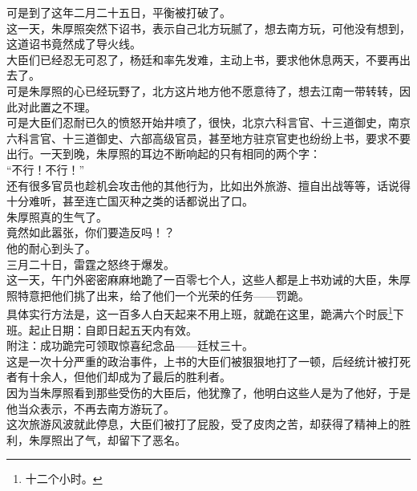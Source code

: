 \begin{multicols}{\theparacolNo}
可是到了这年二月二十五日，平衡被打破了。\\

这一天，朱厚照突然下诏书，表示自己北方玩腻了，想去南方玩，可他没有想到，这道诏书竟然成了导火线。\\

大臣们已经忍无可忍了，杨廷和率先发难，主动上书，要求他休息两天，不要再出去了。\\

可是朱厚照的心已经玩野了，北方这片地方他不愿意待了，想去江南一带转转，因此对此置之不理。\\

可是大臣们忍耐已久的愤怒开始井喷了，很快，北京六科言官、十三道御史，南京六科言官、十三道御史、六部高级官员，甚至地方驻京官吏也纷纷上书，要求不要出行。一天到晚，朱厚照的耳边不断响起的只有相同的两个字：\\

“不行！不行！”\\

还有很多官员也趁机会攻击他的其他行为，比如出外旅游、擅自出战等等，话说得十分难听，甚至连亡国灭种之类的话都说出了口。\\

朱厚照真的生气了。\\

竟然如此嚣张，你们要造反吗！？\\

他的耐心到头了。\\

三月二十日，雷霆之怒终于爆发。\\

这一天，午门外密密麻麻地跪了一百零七个人，这些人都是上书劝诫的大臣，朱厚照特意把他们挑了出来，给了他们一个光荣的任务——罚跪。\\

具体实行方法是，这一百多人白天起来不用上班，就跪在这里，跪满六个时辰\footnote{十二个小时。}下班。起止日期：自即日起五天内有效。\\

附注：成功跪完可领取惊喜纪念品——廷杖三十。\\

这是一次十分严重的政治事件，上书的大臣们被狠狠地打了一顿，后经统计被打死者有十余人，但他们却成为了最后的胜利者。\\

因为当朱厚照看到那些受伤的大臣后，他犹豫了，他明白这些人是为了他好，于是他当众表示，不再去南方游玩了。\\

这次旅游风波就此停息，大臣们被打了屁股，受了皮肉之苦，却获得了精神上的胜利，朱厚照出了气，却留下了恶名。\\


\end{multicols}
